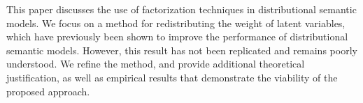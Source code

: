This paper discusses the use of factorization techniques in distributional semantic models. We focus on a method for redistributing the weight of latent variables, which have previously been shown to improve the performance of distributional semantic models. However, this result has not been replicated and remains poorly understood. We refine the method, and provide additional theoretical justification, as well as empirical results that demonstrate the viability of the proposed approach.
